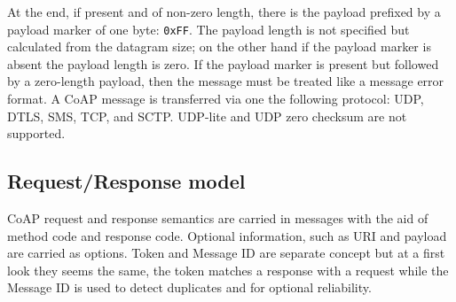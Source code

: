 	At the end, if present and of non-zero length, there is the payload prefixed by a payload marker of one byte: \texttt{0xFF}.\newline
	The payload length is not specified but calculated from the datagram size; on the other hand if the payload marker is absent the payload length is zero.\newline
	If the payload marker is present but followed by a zero-length payload, then the message must be treated like a message error format.\newline
	A CoAP message is transferred via one the following protocol: UDP, DTLS, SMS, TCP, and SCTP.\newline
	UDP-lite and UDP zero checksum are not supported.\newline
	\newpage

	\newpage
				
		
	
	\subsection{Request/Response model}
	CoAP request and response semantics are carried in messages with the aid of method code and response code.\newline
	Optional information, such as URI and payload are carried as options.\newline
	Token and Message ID are separate concept but at a first look they seems the same, the token matches a response
	with a request while the Message ID is used to detect duplicates and for optional reliability.\newline
	
